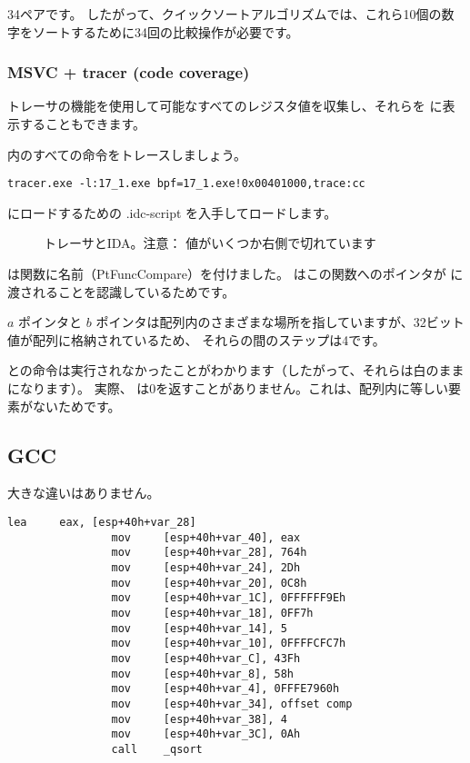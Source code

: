 34ペアです。
したがって、クイックソートアルゴリズムでは、これら10個の数字をソートするために34回の比較操作が必要です。

\clearpage
\subsubsection{MSVC + tracer (code coverage)}

トレーサの機能を使用して可能なすべてのレジスタ値を収集し、それらを \IDA に表示することもできます。

\comp 内のすべての命令をトレースしましょう。

\begin{lstlisting}
tracer.exe -l:17_1.exe bpf=17_1.exe!0x00401000,trace:cc
\end{lstlisting}

\IDA にロードするための .idc-script を入手してロードします。

\begin{figure}[H]
\centering
{}
\caption{トレーサとIDA。注意：
値がいくつか右側で切れています}
\label{fig:qsort_tracer_cc}
\end{figure}

\IDA は関数に名前（PtFuncCompare）を付けました。 \IDA はこの関数へのポインタが \qsort に渡されることを認識しているためです。

$a$ ポインタと $b$ ポインタは配列内のさまざまな場所を指していますが、32ビット値が配列に格納されているため、
それらの間のステップは4です。

との命令は実行されなかったことがわかります（したがって、それらは白のままになります）。
実際、 \comp は0を返すことがありません。これは、配列内に等しい要素がないためです。

\subsection{GCC}

大きな違いはありません。

\begin{lstlisting}[caption=GCC,style=customasmx86]
                lea     eax, [esp+40h+var_28]
                mov     [esp+40h+var_40], eax
                mov     [esp+40h+var_28], 764h
                mov     [esp+40h+var_24], 2Dh
                mov     [esp+40h+var_20], 0C8h
                mov     [esp+40h+var_1C], 0FFFFFF9Eh
                mov     [esp+40h+var_18], 0FF7h
                mov     [esp+40h+var_14], 5
                mov     [esp+40h+var_10], 0FFFFCFC7h
                mov     [esp+40h+var_C], 43Fh
                mov     [esp+40h+var_8], 58h
                mov     [esp+40h+var_4], 0FFFE7960h
                mov     [esp+40h+var_34], offset comp
                mov     [esp+40h+var_38], 4
                mov     [esp+40h+var_3C], 0Ah
                call    _qsort
\end{lstlisting}

